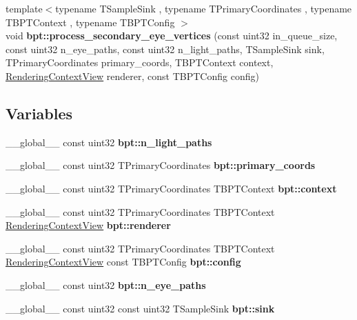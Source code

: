 \begin{DoxyCompactItemize}
\item 
\mbox{\label{group___b_p_t_lib_gaf8a23de4970e1db67ceaf75beb775098}} 
{\footnotesize template$<$typename T\+Sample\+Sink , typename T\+Primary\+Coordinates , typename T\+B\+P\+T\+Context , typename T\+B\+P\+T\+Config $>$ }\\void {\bfseries bpt\+::process\+\_\+secondary\+\_\+eye\+\_\+vertices} (const uint32 in\+\_\+queue\+\_\+size, const uint32 n\+\_\+eye\+\_\+paths, const uint32 n\+\_\+light\+\_\+paths, T\+Sample\+Sink sink, T\+Primary\+Coordinates primary\+\_\+coords, T\+B\+P\+T\+Context context, \hyperlink{struct_rendering_context_view}{Rendering\+Context\+View} renderer, const T\+B\+P\+T\+Config config)
\end{DoxyCompactItemize}
\subsection*{Variables}
\begin{DoxyCompactItemize}
\item 
\mbox{\label{group___b_p_t_lib_ga5bbf5f0ae07fbe07701dbe59c7d4aa54}} 
\+\_\+\+\_\+global\+\_\+\+\_\+ const uint32 {\bfseries bpt\+::n\+\_\+light\+\_\+paths}
\item 
\mbox{\label{group___b_p_t_lib_gad5d08701b2a61de51bd59919339d80e7}} 
\+\_\+\+\_\+global\+\_\+\+\_\+ const uint32 T\+Primary\+Coordinates {\bfseries bpt\+::primary\+\_\+coords}
\item 
\mbox{\label{group___b_p_t_lib_ga7ea19b5d4341b06f9ff95a43be57e53c}} 
\+\_\+\+\_\+global\+\_\+\+\_\+ const uint32 T\+Primary\+Coordinates T\+B\+P\+T\+Context {\bfseries bpt\+::context}
\item 
\mbox{\label{group___b_p_t_lib_ga1b15f6ec6f47d69cfaba14d3896458b5}} 
\+\_\+\+\_\+global\+\_\+\+\_\+ const uint32 T\+Primary\+Coordinates T\+B\+P\+T\+Context \hyperlink{struct_rendering_context_view}{Rendering\+Context\+View} {\bfseries bpt\+::renderer}
\item 
\+\_\+\+\_\+global\+\_\+\+\_\+ const uint32 T\+Primary\+Coordinates T\+B\+P\+T\+Context \hyperlink{struct_rendering_context_view}{Rendering\+Context\+View} const T\+B\+P\+T\+Config {\bfseries bpt\+::config}
\item 
\mbox{\label{group___b_p_t_lib_gafdacf591e051455127691fc7bb25c02b}} 
\+\_\+\+\_\+global\+\_\+\+\_\+ const uint32 {\bfseries bpt\+::n\+\_\+eye\+\_\+paths}
\item 
\mbox{\label{group___b_p_t_lib_ga1a5a48bee5847f8520a9800dfca4acad}} 
\+\_\+\+\_\+global\+\_\+\+\_\+ const uint32 const uint32 T\+Sample\+Sink {\bfseries bpt\+::sink}
\end{DoxyCompactItemize}


